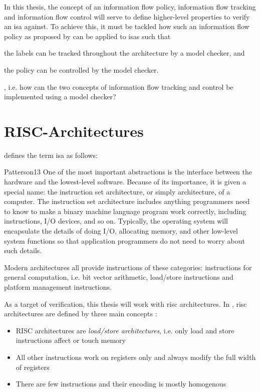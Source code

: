 In this thesis, the concept of an information flow policy, information flow tracking and information flow control will serve to define higher-level properties to verify an \gls{isa} against.
To achieve this, it must be tackled how such an information flow policy as proposed by \citeauthor{Ferraiuolo17} can be applied to \glspl{isa} such that \begin{enumerate*}[label=\alph*)]
    \item the labels can be tracked throughout the architecture by a model checker, and
    \item the policy can be controlled by the model checker.
\end{enumerate*}, i.e. how can the two concepts of information flow tracking and control be implemented using a model checker?

\section{RISC-Architectures}
\label{sec:riscs}

 defines the term \gls{isa} as follows:
\begin{displaycquote}[p.22]{Patterson13}
    One of the most important abstractions  is the interface between the hardware and the lowest-level software.
    Because of its importance, it is given a special name: the instruction set architecture, or simply architecture, of a computer.
    The instruction set architecture includes anything programmers need to know to make a binary machine language program work correctly, including instructions, I/O devices, and so on.
    Typically, the operating system will encapsulate the details of doing I/O, allocating memory, and other low-level system functions so that application programmers do not need to worry about such details.
\end{displaycquote}

Modern architectures all provide instructions of these categories: instructions for general computation, i.e. bit vector arithmetic, load/store instructions and platform management instructions.

As a target of verification, this thesis will work with \gls{risc} architectures.
In , \gls{risc} architectures are defined by three main concepts \cite[p.C-4]{Hennessy12}:
\begin{itemize}
    \item RISC architectures are \textit{load/store architectures}, i.e. only load and store instructions affect or touch memory
    \item All other instructions work on registers only and always modify the full width of registers
    \item There are few instructions and their encoding is mostly homogenous
\end{itemize}

